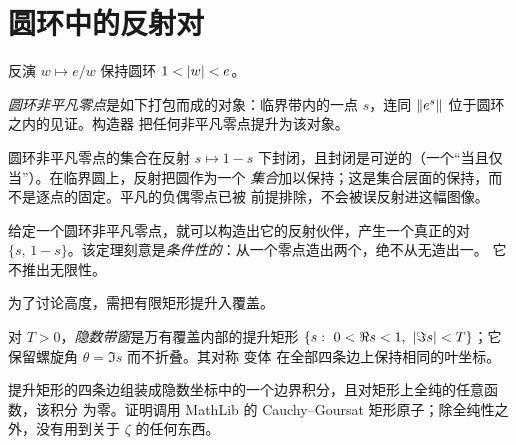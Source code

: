 \section{圆环中的反射对}\label{sec:pairs}

\begin{proposition}\label{prop:preserves}
反演 $w\mapsto e/w$ 保持圆环 $1<\lvert w\rvert<e$。
\end{proposition}

\begin{definition}\label{def:annzero}
\emph{圆环非平凡零点}是如下打包而成的对象：临界带内的一点 $s$，连同
$\lVert e^{s}\rVert$ 位于圆环之内的见证。构造器
 把任何非平凡零点提升为该对象。
\end{definition}

\begin{proposition}\label{prop:closes}
圆环非平凡零点的集合在反射 $s\mapsto
1-s$ 下封闭，且封闭是可逆的（一个“当且仅当”）。在临界圆上，反射把圆作为一个
\emph{集合}加以保持；这是集合层面的保持，而不是逐点的固定。平凡的负偶零点已被
前提排除，不会被误反射进这幅图像。
\end{proposition}

\begin{theorem}\label{thm:pairs}
给定一个圆环非平凡零点，就可以构造出它的反射伙伴，产生一个真正的对
$\{s,\,1-s\}$。该定理刻意是\emph{条件性的}：从一个零点造出两个，绝不从无造出一。
它不推出无限性。
\end{theorem}

为了讨论高度，需把有限矩形提升入覆盖。

\begin{definition}\label{def:window}
对 $T>0$，\emph{隐数带窗}是万有覆盖内部的提升矩形
$\{s:\ 0<\Re s<1,\ \lvert \Im s\rvert<T\}$；它保留螺旋角 $\theta=\Im s$ 而不折叠。其对称
变体  在全部四条边上保持相同的叶坐标。
\end{definition}

\begin{proposition}
\label{prop:boundaryint}
提升矩形的四条边组装成隐数坐标中的一个边界积分，且对矩形上全纯的任意函数，该积分
为零。证明调用 MathLib 的 Cauchy--Goursat 矩形原子；除全纯性之外，没有用到关于
$\zeta$ 的任何东西。
\end{proposition}

